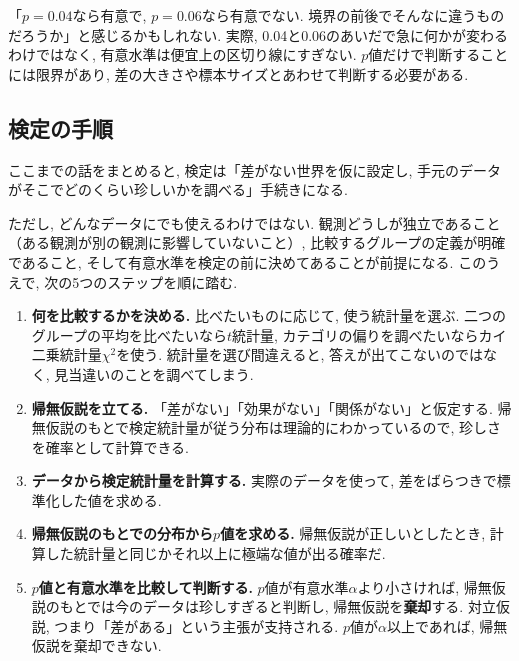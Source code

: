     「$p = 0.04$なら有意で, $p = 0.06$なら有意でない. 境界の前後でそんなに違うものだろうか」と感じるかもしれない.
    実際, 0.04と0.06のあいだで急に何かが変わるわけではなく, 有意水準は便宜上の区切り線にすぎない.
    $p$値だけで判断することには限界があり,
    差の大きさや標本サイズとあわせて判断する必要がある.


  \subsection{検定の手順}

    ここまでの話をまとめると, 検定は「差がない世界を仮に設定し, 手元のデータがそこでどのくらい珍しいかを調べる」手続きになる.

    ただし, どんなデータにでも使えるわけではない.
    観測どうしが独立であること（ある観測が別の観測に影響していないこと）, 比較するグループの定義が明確であること, そして有意水準を検定の前に決めてあることが前提になる.
    このうえで, 次の5つのステップを順に踏む.

    \begin{enumerate}
      \item \textbf{何を比較するかを決める.}
        比べたいものに応じて, 使う統計量を選ぶ.
        二つのグループの平均を比べたいなら$t$統計量,
        カテゴリの偏りを調べたいならカイ二乗統計量$\chi^2$を使う.
        統計量を選び間違えると, 答えが出てこないのではなく, 見当違いのことを調べてしまう.

      \item \textbf{帰無仮説を立てる.}
        「差がない」「効果がない」「関係がない」と仮定する.
        帰無仮説のもとで検定統計量が従う分布は理論的にわかっているので, 珍しさを確率として計算できる.

      \item \textbf{データから検定統計量を計算する.}
        実際のデータを使って, 差をばらつきで標準化した値を求める.

      \item \textbf{帰無仮説のもとでの分布から$p$値を求める.}
        帰無仮説が正しいとしたとき, 計算した統計量と同じかそれ以上に極端な値が出る確率だ.

      \item \textbf{$p$値と有意水準を比較して判断する.}
        $p$値が有意水準$\alpha$より小さければ, 帰無仮説のもとでは今のデータは珍しすぎると判断し,
        帰無仮説を\textbf{棄却}する. 対立仮説, つまり「差がある」という主張が支持される.
        $p$値が$\alpha$以上であれば, 帰無仮説を棄却できない.
    \end{enumerate}

